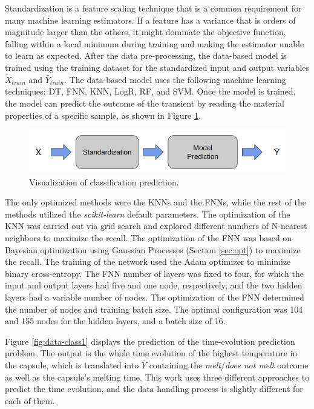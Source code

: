 Standardization is a feature scaling technique that is a common requirement for many machine learning estimators.
If a feature has a variance that is orders of magnitude larger than the others, it might dominate the objective function, falling within a local minimum during training and making the estimator unable to learn as expected.
After the data pre-processing, the data-based model is trained using the training dataset for the standardized input and output variables $\tilde{X}_{train}$ and $\bar{Y}_{train}$.
The data-based model uses the following machine learning techniques: DT, FNN, KNN, LogR, RF, and SVM.
Once the model is trained, the model can predict the outcome of the transient by reading the material properties of a specific sample, as shown in Figure \ref{fig:data-class0}.

\begin{figure}[htbp!] %
  \centering
  \includegraphics[width=0.7\linewidth]{figures/data-prediction}
  \caption{Visualization of classification prediction.}
  \label{fig:data-class0}
\end{figure}

The only optimized methods were the KNNs and the FNNs, while the rest of the methods utilized the \textit{scikit-learn} default parameters.
The optimization of the KNN was carried out via grid search and explored different numbers of N-nearest neighbors to maximize the recall.
The optimization of the FNN was based on Bayesian optimization using Gaussian Processes (Section \ref{sec:opt}) to maximize the recall.
The training of the network used the Adam optimizer to minimize binary cross-entropy.
The FNN number of layers was fixed to four, for which the input and output layers had five and one node, respectively, and the two hidden layers had a variable number of nodes.
The optimization of the FNN determined the number of nodes and training batch size.
The optimal configuration was 104 and 155 nodes for the hidden layers, and a batch size of 16.

Figure \ref{fig:data-class1} displays the prediction of the time-evolution prediction problem.
The output is the whole time evolution of the highest temperature in the capsule, which is translated into $\bar{Y}$ containing the \textit{melt}/\textit{does not melt} outcome as well as the capsule's melting time.
This work uses three different approaches to predict the time evolution, and the data handling process is slightly different for each of them.

